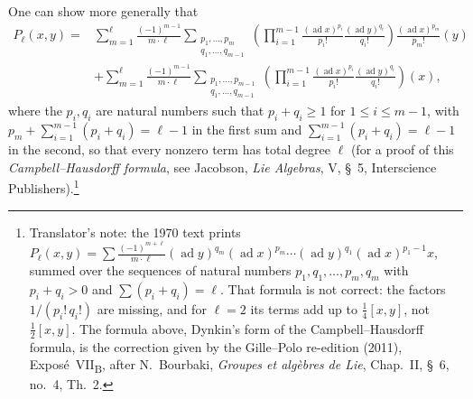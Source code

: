 One can show more generally that
\label{sga3:VIIB:3.2.1:campbell-hausdorff}
\[
\begin{aligned}
  P_\ell(x,y)
  ={}&
  \sum_{m=1}^{\ell}
  \frac{(-1)^{m-1}}{m\cdot\ell}
  \sum_{\substack{
    p_1,\ldots,p_m\\
    q_1,\ldots,q_{m-1}
  }}
  \left(
    \prod_{i=1}^{m-1}
    \frac{(\operatorname{ad}x)^{p_i}}{p_i!}
    \frac{(\operatorname{ad}y)^{q_i}}{q_i!}
  \right)
  \frac{(\operatorname{ad}x)^{p_m}}{p_m!}(y)
  \\
  &+
  \sum_{m=1}^{\ell}
  \frac{(-1)^{m-1}}{m\cdot\ell}
  \sum_{\substack{
    p_1,\ldots,p_{m-1}\\
    q_1,\ldots,q_{m-1}
  }}
  \left(
    \prod_{i=1}^{m-1}
    \frac{(\operatorname{ad}x)^{p_i}}{p_i!}
    \frac{(\operatorname{ad}y)^{q_i}}{q_i!}
  \right)(x),
\end{aligned}
\]
where the \(p_i,q_i\) are natural numbers such that \(p_i+q_i\geq1\) for
\(1\leq i\leq m-1\), with \(p_m+\sum_{i=1}^{m-1}(p_i+q_i)=\ell-1\) in the first
sum and \(\sum_{i=1}^{m-1}(p_i+q_i)=\ell-1\) in the second, so that every
nonzero term has total degree \(\ell\) \textup{(}for a proof of this
\emph{Campbell--Hausdorff formula}, see Jacobson, \emph{Lie Algebras}, V,
\S~5, Interscience Publishers\textup{)}.\footnote{Translator's note: the 1970 text prints
\(P_\ell(x,y)=\sum\frac{(-1)^{m+\ell}}{m\cdot\ell}(\operatorname{ad}y)^{q_m}(\operatorname{ad}x)^{p_m}\cdots
(\operatorname{ad}y)^{q_1}(\operatorname{ad}x)^{p_1-1}x\), summed over the sequences of natural numbers
\(p_1,q_1,\ldots,p_m,q_m\) with \(p_i+q_i>0\) and \(\sum(p_i+q_i)=\ell\). That formula is not correct: the
factors \(1/(p_i!\,q_i!)\) are missing, and for \(\ell=2\) its terms add up to \(\frac14[x,y]\), not
\(\frac12[x,y]\). The formula above, Dynkin's form of the Campbell--Hausdorff formula, is the correction
given by the Gille--Polo re-edition (2011), Expos\'e~VII\textsubscript{B}, after N.~Bourbaki,
\emph{Groupes et alg\`ebres de Lie}, Chap.~II, \S~6, no.~4, Th.~2.}
